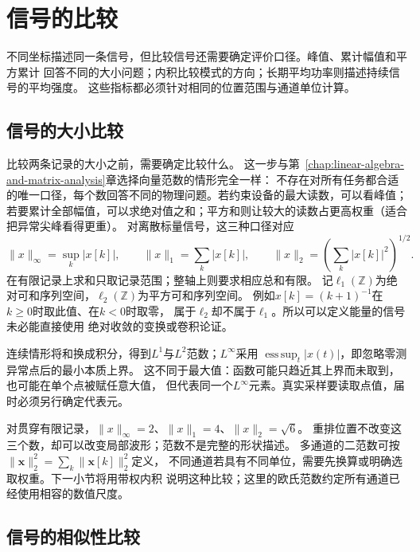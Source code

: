 \section{信号的比较}
\label{sec:signal-comparison}

不同坐标描述同一条信号，但比较信号还需要确定评价口径。峰值、累计幅值和平方累计
回答不同的大小问题；内积比较模式的方向；长期平均功率则描述持续信号的平均强度。
这些指标都必须针对相同的位置范围与通道单位计算。

\subsection{信号的大小比较}

比较两条记录的大小之前，需要确定比较什么。
这一步与第~\ref{chap:linear-algebra-and-matrix-analysis}章选择向量范数的情形完全一样：
不存在对所有任务都合适的唯一口径，每个数回答不同的物理问题。若约束设备的最大读数，可以看峰值；
若要累计全部幅值，可以求绝对值之和；平方和则让较大的读数占更高权重（适合把异常尖峰看得更重）。
对离散标量信号，这三种口径对应
\[
  \|x\|_\infty=\sup_k|x[k]|,\qquad
  \|x\|_1=\sum_k|x[k]|,\qquad
  \|x\|_2=\left(\sum_k|x[k]|^2\right)^{1/2}.
\]
在有限记录上求和只取记录范围；整轴上则要求相应总和有限。
记$\ell_1(\mathbb Z)$为绝对可和序列空间，$\ell_2(\mathbb Z)$为平方可和序列空间。
例如$x[k]=(k+1)^{-1}$在$k\geq0$时取此值、在$k<0$时取零，
属于$\ell_2$却不属于$\ell_1$。所以可以定义能量的信号未必能直接使用
绝对收敛的变换或卷积论证。

连续情形将和换成积分，得到$L^1$与$L^2$范数；$L^\infty$采用
$\operatorname*{ess\,sup}_t|x(t)|$，即忽略零测异常点后的最小本质上界。
这不同于最大值：函数可能只趋近其上界而未取到，也可能在单个点被赋任意大值，
但代表同一个$L^\infty$元素。真实采样要读取点值，届时必须另行确定代表元。

对贯穿有限记录，$\|x\|_\infty=2$、$\|x\|_1=4$、$\|x\|_2=\sqrt6$。
重排位置不改变这三个数，却可以改变局部波形；范数不是完整的形状描述。
多通道的二范数可按
$\|\bm x\|_2^2=\sum_k\|\bm x[k]\|_2^2$定义，
不同通道若具有不同单位，需要先换算或明确选取权重。下一小节将用带权内积
说明这种比较；这里的欧氏范数约定所有通道已经使用相容的数值尺度。

\subsection{信号的相似性比较}

